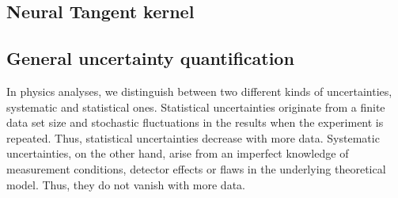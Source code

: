 \documentclass[11pt,a4paper]{article}
\begin{document}
\subsection{Neural Tangent kernel}
\label{sec:NTK}
%

%
\subsection{General uncertainty quantification} %
In physics analyses, we distinguish between two different kinds of uncertainties, systematic and statistical ones.
Statistical uncertainties originate from a finite data set size and stochastic fluctuations in the results when the experiment is repeated. Thus, statistical uncertainties decrease with more data.
Systematic uncertainties, on the other hand, arise from an imperfect knowledge of measurement conditions, detector effects or flaws in the underlying theoretical model. Thus, they do not vanish with more data.
\end{document}
